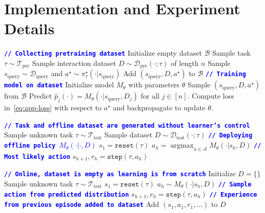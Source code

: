 \documentclass{article}
\newcommand{\Acal}{\mathcal{A}}
\newcommand{\Bcal}{\mathcal{B}}
\newcommand{\Dcal}{\mathcal{D}}
\newcommand{\Tcal}{{\mathcal{T}}}
\newcommand*{\argmax}{\mathop{\mathrm{argmax}}}
\newcommand{\algcomment}[1]{\textcolor{blue}{\footnotesize{\texttt{\textbf{// #1}}}}}
\newcommand{\pretraind}{\Dcal_{\text{pre}}}
\newcommand{\pretraint}{\Tcal_{\text{pre}}}
\newcommand{\testt}{\Tcal_{\text{test}}}
\newcommand{\testd}{\Dcal_{\text{test}}}
\newcommand{\squery}{s_{\text{query}}}
\newcommand{\Dquery}{\Dcal_{\text{query}}}
\newcommand{\pistar}{\pi^{\star}}
\begin{document}
\section{Implementation and Experiment Details}
\label{app:experiment-details}
\begin{algorithm}
\caption{Decision-Pretrained Transformer (detailed)}
\begin{algorithmic}[1]
		\STATE \algcomment{Collecting pretraining dataset}
        \STATE Initialize empty dataset $\Bcal$
            \STATE Sample task $\tau \sim \pretraint$
            \STATE Sample interaction dataset $D \sim \pretraind (\cdot ; \tau)$ of length $n$
            \STATE Sample $\squery \sim \Dquery$ and $a^\star \sim \pistar_\tau(\cdot | \squery)$
            \STATE Add $(\squery, D, a^\star)$ to $\Bcal$
        \ENDFOR
        \STATE \algcomment{Training model on dataset}
        \STATE Initialize model $M_{\theta}$ with parameters $\theta$
            \STATE Sample $(\squery, D, a^\star)$ from $\Bcal$
            \STATE Predict $\hat p_j(\cdot) = M_{\theta}(\cdot  | \squery, D_j)$ for all $j \in [n]$.
            \STATE Compute loss in~\eqref{eq:app-loss} with respect to $a^\star$ and backpropagate to update $\theta$.
        \ENDWHILE
\end{algorithmic}
\end{algorithm}
\begin{algorithm}
\caption{Offline test-time deployment (detailed)}
\begin{algorithmic}[1]
        \STATE \algcomment{Task and offline dataset are generated without learner's control}
        \STATE Sample unknown task $\tau \sim \testt$
        \STATE Sample dataset $D \sim \testd(\cdot; \tau)$
        \STATE \algcomment{Deploying offline policy $M_{\theta}(\cdot | \cdot, D)$}
        \STATE $s_1 = \texttt{reset}(\tau)$
            \STATE $a_h = \argmax_{a \in \Acal} M_{\theta} (\cdot | s_h, D)$ \algcomment{Most likely action}
            \STATE $s_{h + 1}, r_h = \texttt{step}(\tau, a_h)$
        \ENDFOR
\end{algorithmic}
\end{algorithm}
\begin{algorithm}
\caption{Online test-time deployment (detailed)}
\begin{algorithmic}[1]
        \STATE \algcomment{Online, dataset is empty as learning is from scratch}
        \STATE Initialize $D = \{\}$
        \STATE Sample unknown task $\tau \sim \testt$
            \STATE $s_1 = \texttt{reset}(\tau)$
                \STATE $a_h \sim M_{\theta}(\cdot | s_h, D)$ \algcomment{Sample action from predicted distribution}
                \STATE $s_{h + 1}, r_h = \texttt{step}(\tau, a_h)$
            \ENDFOR
            \STATE \algcomment{Experience from previous episode added to dataset}
            \STATE Add $(s_1, a_1, r_1, \ldots)$ to $D$
        \ENDFOR
\end{algorithmic}
\end{algorithm}
\end{document}
